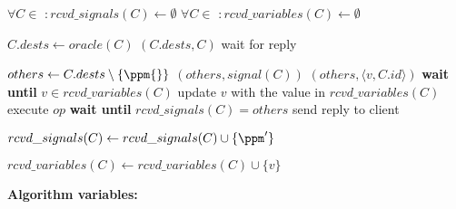 \begin{algorithm}[t!]
\small

\begin{distribalgo}[1]

\vspace{1mm}

    \STATE $\forall C \in $ \kk $ : rcvd\_signals(C) \leftarrow \emptyset$
    \STATE $\forall C \in $ \kk $ : rcvd\_variables(C) \leftarrow \emptyset$
\ENDINDENT

\vspace{1.25mm}
    \STATE $C.dests \leftarrow oracle(C)$ \label{algline:oracle} 
	\STATE \amcast$(C.dests, C)$ \label{algline:climcast}
	\STATE wait for reply
\ENDINDENT

\vspace{1.25mm}
	    \STATE $others \leftarrow C.dests \setminus \{\ppm{}\}$
	    \STATE \rmcast$(others, signal(C))$ \label{algline:mcastsignals}
			        \STATE \rmcast$(others, \langle v, C.id \rangle)$ \label{algline:multicastv}
			    \ELSE
			        \STATE \textbf{wait until} $v \in rcvd\_variables(C)$ \label{algline:waitvariable}
			        \STATE update $v$ with the value in $rcvd\_variables(C)$
			    \ENDIF
			\ENDIF
			\STATE execute $op$ \label{algline:executeopck}
		\ENDFOR
		\STATE \textbf{wait until} $rcvd\_signals(C) = others$ \label{algline:waitsignals}
		\STATE send reply to client \label{algline:sendreply}
	\ENDINDENT
	
	\vspace{1.25mm}
	    \STATE $rcvd\_signals(C) \leftarrow rcvd\_signals(C) \cup \{\ppm'\}$
	\ENDINDENT

	\vspace{1.25mm}
	    \STATE $rcvd\_variables(C) \leftarrow rcvd\_variables(C) \cup \{v\}$
	\ENDINDENT
			
\ENDINDENT

\vspace{1.7mm}

\textbf{Algorithm variables:}

\vspace{1.25mm}


\end{distribalgo}
\end{algorithm}

